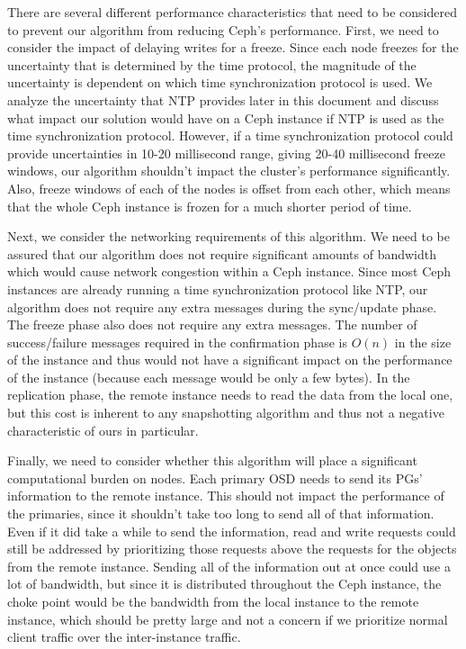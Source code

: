 There are several different performance characteristics that need to
be considered to prevent our algorithm from reducing Ceph's
performance. First, we need to consider the impact of delaying writes
for a freeze. Since each node freezes for the uncertainty that is
determined by the time protocol, the magnitude of the uncertainty is
dependent on which time synchronization protocol is used. We analyze
the uncertainty that NTP provides later in this document and discuss
what impact our solution would have on a Ceph instance if NTP is used
as the time synchronization protocol. However, if a time
synchronization protocol could provide uncertainties in 10-20
millisecond range, giving 20-40 millisecond freeze windows, our
algorithm shouldn't impact the cluster's performance
significantly. Also, freeze windows of each of the nodes is offset
from each other, which means that the whole Ceph instance is frozen
for a much shorter period of time.

Next, we consider the networking requirements of this algorithm. We
need to be assured that our algorithm does not require significant
amounts of bandwidth which would cause network congestion within a
Ceph instance. Since most Ceph instances are already running a time
synchronization protocol like NTP, our algorithm does not require any
extra messages during the sync/update phase. The freeze phase also
does not require any extra messages. The number of success/failure
messages required in the confirmation phase is $O(n)$ in the size of
the instance and thus would not have a significant impact on the
performance of the instance (because each message would be only a few
bytes). In the replication phase, the remote instance needs to read
the data from the local one, but this cost is inherent to any
snapshotting algorithm and thus not a negative characteristic of ours
in particular.

Finally, we need to consider whether this algorithm will place a
significant computational burden on nodes. Each primary OSD needs to
send its PGs' information to the remote instance. This should not
impact the performance of the primaries, since it shouldn't take too
long to send all of that information. Even if it did take a while to
send the information, read and write requests could still be addressed
by prioritizing those requests above the requests for the objects from
the remote instance. Sending all of the information out at once could
use a lot of bandwidth, but since it is distributed throughout the
Ceph instance, the choke point would be the bandwidth from the local
instance to the remote instance, which should be pretty large and not
a concern if we prioritize normal client traffic over the
inter-instance traffic.

